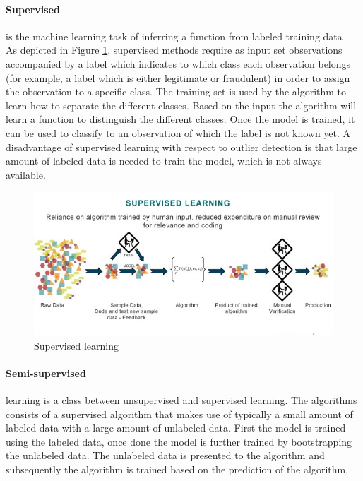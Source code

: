 \paragraph{Supervised} is the machine learning task of inferring a function from labeled training data \cite{9780262018258}. As depicted in Figure \ref{fig:supervised}, supervised methods require as input set observations accompanied by a label which indicates to which class each observation belongs (for example, a label which is either legitimate or fraudulent) in order to assign the observation to a specific class. The training-set is used by the algorithm to learn how to separate the different classes. Based on the input the algorithm will learn a function to distinguish the different classes. Once the model is trained, it can be used to classify to an observation of which the label is not known yet. A disadvantage of supervised learning with respect to outlier detection is that large amount of labeled data is needed to train the model, which is not always available. 

\begin{figure}[ht!]
\centering
\includegraphics[width=\textwidth]{figures/supervised.jpg}
\caption{Supervised learning}
\label{fig:supervised}
\end{figure}

\paragraph{Semi-supervised} learning is a class between unsupervised and supervised learning. The algorithms consists of a supervised algorithm that makes use of typically a small amount of labeled data with a large amount of unlabeled data. First the model is trained using the labeled data, once done the model is further trained by bootstrapping the unlabeled data. The unlabeled data is presented to the algorithm and subsequently the algorithm is trained based on the prediction of the algorithm.

